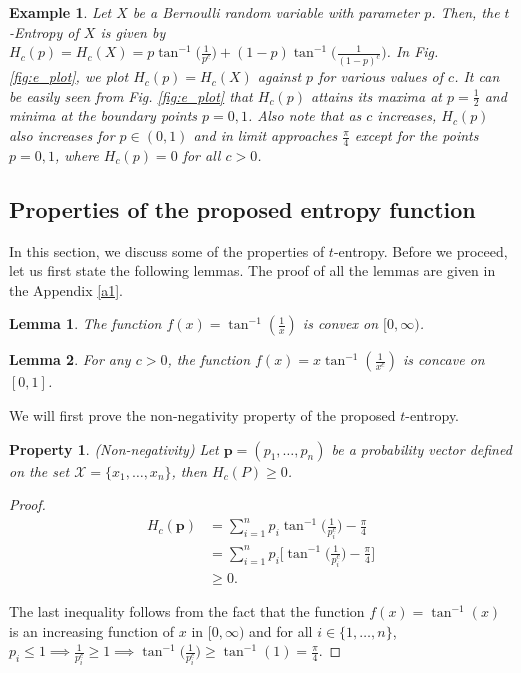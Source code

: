 \documentclass{article}
\newcommand{\bp}{\boldsymbol{p}}
\newtheorem{lem}{Lemma}
\newtheorem{prop}{Property}
\newtheorem{ex}{Example}
\begin{document}
\begin{ex}
\normalfont
Let $X$ be a Bernoulli random variable with parameter $p$. Then, the $t$-Entropy of $X$ is given by $H_c(p)=H_c(X)=p \tan^{-1}\bigg(\frac{1}{p^c}\bigg)+(1-p) \tan^{-1}\bigg(\frac{1}{(1-p)^c}\bigg)$. In Fig. \ref{fig:e_plot}, we plot $H_c(p)=H_c(X)$ against $p$ for various values of $c$. It can be easily seen from Fig. \ref{fig:e_plot} that $H_c(p)$ attains its maxima at $p=\frac{1}{2}$ and minima at the boundary points $p=0,1$. Also note that as $c$ increases, $H_c(p)$ also increases for $p \in (0,1)$ and in limit approaches $\frac{\pi}{4}$ except for the points $p=0,1$, where $H_c(p)=0$ for all $c>0$.
\end{ex}
\subsection{Properties of the proposed entropy function}\label{property}
In this section, we discuss some of the properties of $t$-entropy. Before we proceed, let us first state the following lemmas. The proof of all the lemmas are given in the Appendix \ref{a1}.

\begin{lem}
\label{l:1}
The function $f(x)=\tan^{-1}\left(\frac{1}{x}\right)$ is convex on $[0,\infty)$.
\end{lem}

\begin{lem}
\label{l:2}
For any $c>0$, the function $f(x)=x \tan^{-1}(\frac{1}{x^c})$ is concave on $[0,1]$. 
\end{lem}

We will first prove the non-negativity property of the proposed $t$-entropy.
\begin{prop}
\label{p:1}
(Non-negativity) Let $\bp=(p_1,\dots,p_n)$ be a probability vector defined on the set $\mathcal{X}=\{x_1,\dots,x_n\}$, then $H_c(P) \geq 0$.
\end{prop}
\begin{proof}

\begin{align*}
H_c(\bp) & =\sum_{i=1}^n p_i \tan^{-1}\bigg(\frac{1}{p_i^c}\bigg) - \frac{\pi}{4}\\
& = \sum_{i=1}^n p_i \bigg[\tan^{-1}\bigg(\frac{1}{p_i^c}\bigg) - \frac{\pi}{4}\bigg]\\
& \geq 0.
\end{align*}

The last inequality follows from the fact that the function $f(x)=\tan^{-1}(x)$ is an increasing function of $x$ in $[0, \infty)$ and for all $i \in \{1,\dots,n\}$, $p_i \leq 1 \implies \frac{1}{p_i^c} \geq 1 \implies \tan^{-1}\bigg(\frac{1}{p_i^c}\bigg) \geq \tan^{-1}(1)=\frac{\pi}{4}.  $
\end{proof}
\end{document}
